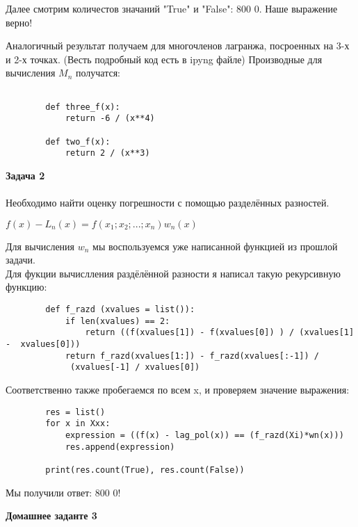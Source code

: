 \documentclass[letterpaper,12pt]{article}
\begin{document}
    Далее смотрим количестов значаний "True" и "False":
    800 0. Наше выражение верно!

    Аналогичный результат получаем для 
    многочленов лагранжа, посроенных на 3-х и 2-х
    точках. (Весть подробный код есть в ipyng файле)
    Производные для вычисления $M_n$ получатся:

    \begin{lstlisting}
        
        def three_f(x):
            return -6 / (x**4)

        def two_f(x):
            return 2 / (x**3)

    \end{lstlisting}

    \textbf{Задача 2}
    \\~\\
    Необходимо найти оценку погрешности с 
    помощью разделённых разностей.

    \begin{center}

        $f(x) - L_n(x) = f(x_1; x_2; ... 
        ;x_n) w_n(x)$

    \end{center}

    Для вычисления $w_n$ мы воспользуемся 
    уже написанной функцией из прошлой задачи.
    \\
    Для фукции вычислления раздёлённой разности 
    я написал такую рекурсивную функцию:

    \begin{lstlisting}
        def f_razd (xvalues = list()):
            if len(xvalues) == 2:
                return ((f(xvalues[1]) - f(xvalues[0]) ) / (xvalues[1] -  xvalues[0])) 
            return f_razd(xvalues[1:]) - f_razd(xvalues[:-1]) /
             (xvalues[-1] / xvalues[0])
    \end{lstlisting}

    Соответственно также пробегаемся по всем x,
    и проверяем значение выражения:

    \begin{lstlisting}
        res = list()
        for x in Xxx:
            expression = ((f(x) - lag_pol(x)) == (f_razd(Xi)*wn(x)))
            res.append(expression)

        print(res.count(True), res.count(False))
    \end{lstlisting}

    Мы получили ответ: 800 0!


    \begin{center}
        \textbf{Домашнее заданте 3}
    \end{center}
\end{document}
